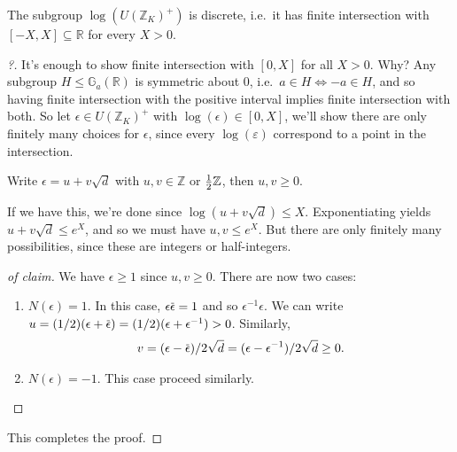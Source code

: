 \begin{proposition}[?]

The subgroup \(\log( U ({\mathbb{Z}}_K)^+ )\) is discrete, i.e.~it has
finite intersection with \([-X, X] \subseteq {\mathbb{R}}\) for every
\(X>0\).

\end{proposition}

\begin{proof}[?]

It's enough to show finite intersection with \([0, X]\) for all \(X>0\).
Why? Any subgroup \(H\leq {\mathbb{G}}_a({\mathbb{R}})\) is symmetric
about 0, i.e.~\(a\in H \iff -a\in H\), and so having finite intersection
with the positive interval implies finite intersection with both. So let
\(\epsilon \in U({\mathbb{Z}}_K)^+\) with
\(\log( \epsilon) \in [0, X]\), we'll show there are only finitely many
choices for \(\epsilon\), since every \(\log(\varepsilon)\) correspond
to a point in the intersection.

\begin{claim}

Write \(\epsilon = u + v \sqrt{d}\) with \(u,v \in {\mathbb{Z}}\) or
\({1\over 2}{\mathbb{Z}}\), then \(u, v \geq 0\).

\end{claim}

If we have this, we're done since \(\log( u + v \sqrt{d}) \leq X\).
Exponentiating yields \(u + v\sqrt {d} \leq e^X\), and so we must have
\(u, v \leq e^X\). But there are only finitely many possibilities, since
these are integers or half-integers.

\begin{proof}[of claim]

We have \(\epsilon \geq 1\) since \(u, v \geq 0\). There are now two
cases:

\begin{enumerate}
\def\labelenumi{\arabic{enumi}.}
\item
  \(N( \epsilon) = 1\). In this case,
  \(\epsilon \mkern 1.5mu\overline{\mkern-1.5mu\epsilon \mkern-1.5mu}\mkern 1.5mu= 1\)
  and so \(\epsilon ^{-1} \epsilon\). We can write
  \(u = (1/2)( \epsilon + \mkern 1.5mu\overline{\mkern-1.5mu\epsilon\mkern-1.5mu}\mkern 1.5mu) = (1/2)(\epsilon + \epsilon ^{-1} ) > 0\).
  Similarly,
  \begin{align*} 
    v = (\epsilon - \mkern 1.5mu\overline{\mkern-1.5mu\epsilon\mkern-1.5mu}\mkern 1.5mu)/2 \sqrt{d} = (\epsilon - \epsilon ^{-1} ) / 2 \sqrt{d} \geq 0
    .\end{align*}
\item
  \(N(\epsilon) = -1\). This case proceed similarly.
\end{enumerate}

\end{proof}

This completes the proof.

\end{proof}


